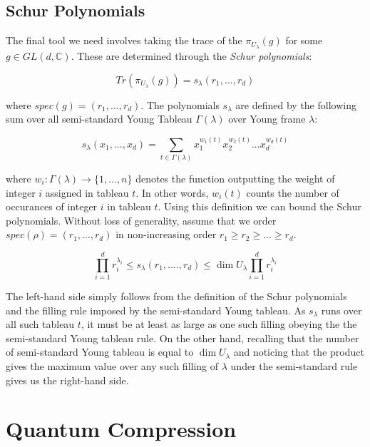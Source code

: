 \documentclass[12pt]{article}%
\begin{document}
\subsection{Schur Polynomials}
The final tool we need involves taking the trace of the $\pi_{U_{\lambda}}(g)$ for some $g \in GL(d, \mathbb{C})$. These are determined through the \textit{Schur polynomials}:

\begin{equation}\label{schurdef}
    Tr(\pi_{U_\lambda}(g)) = s_{\lambda}(r_1,...,r_d)
\end{equation}

\noindent where $spec(g) = (r_1,...,r_d)$. The polynomials $s_\lambda$ are defined by the following sum over all semi-standard Young Tableau $\Gamma(\lambda)$ over Young frame $\lambda$:

\begin{equation}
  s_{\lambda}(x_1,...,x_d) = \sum_{t \in \Gamma(\lambda)} x_1^{w_1(t)}x_2^{w_2(t)}...x_d^{w_d(t)}
\end{equation}

\noindent where $w_i: \Gamma(\lambda) \rightarrow \{1,...,n\}$ denotes the function outputting the weight of integer $i$ assigned in tableau $t$. In other words, $w_i(t)$ counts the number of occurances of integer $i$ in tableau $t$. Using this definition we can bound the Schur polynomials. Without loss of generality, assume that we order $spec(\rho) = (r_1,...,r_d)$ in non-increasing order $r_1 \geq r_2 \geq ... \geq r_d$.

\begin{equation} \label{schur}
  \prod_{i=1}^d r_i^{\lambda_i} \leq s_{\lambda}(r_1,....,r_d) \leq \dim{U_\lambda} \prod_{i=1}^d r_i^{\lambda_i}
\end{equation}

The left-hand side simply follows from the definition of the Schur polynomials and the filling rule imposed by the semi-standard Young tableau. As $s_\lambda$ runs over all such tableau $t$, it must be at least as large as one such filling obeying the the semi-standard Young tableau rule.
On the other hand, recalling that the number of semi-standard Young tableau is equal to $\dim U_{\lambda}$ and noticing that the product gives the maximum value over any such filling of $\lambda$ under the semi-standard rule gives us the right-hand side.

\section{Quantum Compression}
\end{document}
